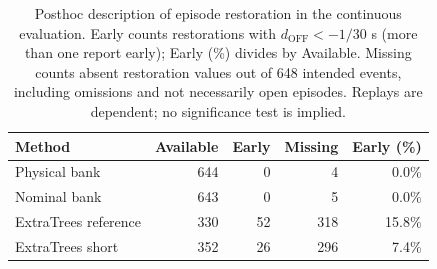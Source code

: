 \begin{table}[t]\centering\footnotesize\setlength{\tabcolsep}{2pt}
\caption{Posthoc description of episode restoration in the continuous evaluation. Early counts restorations with $d_{\mathrm{OFF}}<-1/30$ s (more than one report early); Early (\%) divides by Available. Missing counts absent restoration values out of 648 intended events, including omissions and not necessarily open episodes. Replays are dependent; no significance test is implied.}
\label{tab:closure-restoration}
\begin{tabular}{@{}lrrrr@{}}\toprule
Method & Available & Early & Missing & Early (\%) \\\midrule
Physical bank & 644 & 0 & 4 & 0.0\% \\
Nominal bank & 643 & 0 & 5 & 0.0\% \\
ExtraTrees reference & 330 & 52 & 318 & 15.8\% \\
ExtraTrees short & 352 & 26 & 296 & 7.4\% \\
\bottomrule\end{tabular}\end{table}
